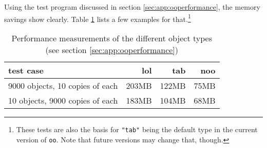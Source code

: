 Using the test program discussed in section \ref{sec:app:ooperformance}, the memory savings show clearly. Table \ref{tab:performance} lists a few examples for that.\footnote{These tests are also the basis for \texttt{"tab"} being the default type in the current version of \texttt{oo}. Note that future versions may change that, though.}

 \begin{table}[h]
 \caption{Performance measurements of the different object types (see section \ref{sec:app:ooperformance})}
 \begin{tabular}{l|rrr}
test case & lol & tab & noo\\
\hline
9000 objects, 10 copies of each & 203MB & 122MB & 75MB \\
10 objects, 9000 copies of each & 183MB & 104MB & 68MB \\
 \end{tabular}
 \label{tab:performance}
 \end{table}


